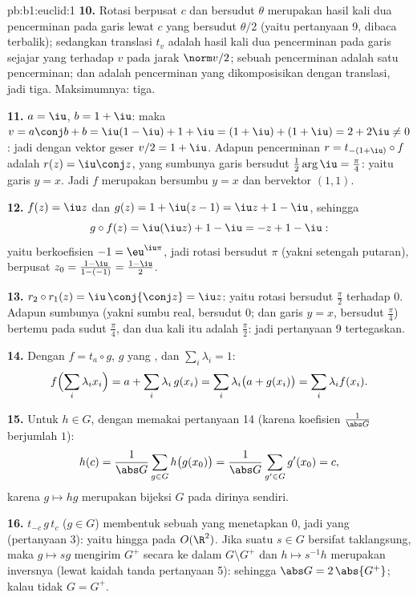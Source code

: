\begin{solution}{pb:b1:euclid:1}
\textbf{10.} Rotasi berpusat $c$ dan bersudut $\theta$ merupakan
hasil kali dua pencerminan pada garis lewat $c$ yang bersudut
$\theta/2$ (yaitu pertanyaan 9, dibaca terbalik); sedangkan translasi $t_v$ adalah
hasil kali dua pencerminan pada garis sejajar yang  terhadap
$v$ pada jarak $\norm v/2$; sebuah pencerminan adalah satu pencerminan; dan
 adalah pencerminan yang dikomposisikan dengan translasi,
jadi tiga. Maksimumnya: tiga.

\textbf{11.} $a = \iu$, $b = 1 + \iu$: maka $v = a\conj b + b =
\iu(1 - \iu) + 1 + \iu = (1 + \iu) + (1 + \iu) = 2 + 2\iu \neq
0$: jadi  dengan vektor geser $v/2 = 1 + \iu$. Adapun
pencerminan $r = t_{-(1+\iu)}\circ f$ adalah $r(z) = \iu\conj z$,
yang sumbunya garis bersudut $\frac12\arg\iu = \frac\pi4$: yaitu
garis $y = x$. Jadi $f$ merupakan  bersumbu $y =
x$ dan bervektor $(1, 1)$.

\textbf{12.} $f(z) = \iu z$ dan $g(z) = 1 + \iu(z - 1) = \iu z
+ 1 - \iu$, sehingga
\[
g\circ f(z) = \iu(\iu z) + 1 - \iu = -z + 1 - \iu :
\]
yaitu berkoefisien  $-1 = \eu^{\iu\pi}$, jadi rotasi bersudut
$\pi$ (yakni setengah putaran), berpusat $z_0 = \frac{1 - \iu}{1 - (-1)}
= \frac{1 - \iu}{2}$.

\textbf{13.} $r_2\circ r_1(z) = \iu\,\conj{\conj z} = \iu z$:
yaitu rotasi bersudut $\frac\pi2$ terhadap $0$. Adapun sumbunya (yakni sumbu
real, bersudut $0$; dan garis $y = x$, bersudut $\frac\pi4$) bertemu pada
sudut $\frac\pi4$, dan dua kali itu adalah $\frac\pi2$: jadi pertanyaan 9
tertegaskan.

\textbf{14.} Dengan $f = t_a\circ g$, $g$ yang , dan $\sum_i
\lambda_i = 1$:
\[
f\Bigl(\sum_i \lambda_i x_i\Bigr)
= a + \sum_i \lambda_i\,g(x_i)
= \sum_i \lambda_i\bigl(a + g(x_i)\bigr)
= \sum_i \lambda_i f(x_i) .
\]

\textbf{15.} Untuk $h \in G$, dengan memakai pertanyaan 14 (karena koefisien
$\frac1{\abs G}$ berjumlah $1$):
\[
h(c) = \frac{1}{\abs G}\sum_{g \in G} h\bigl(g(x_0)\bigr)
= \frac{1}{\abs G}\sum_{g' \in G} g'(x_0) = c ,
\]
karena $g \mapsto hg$ merupakan bijeksi $G$ pada dirinya sendiri.

\textbf{16.}  $t_{-c}\,g\,t_{c}$ ($g \in G$) membentuk
sebuah   yang menetapkan $0$, jadi  yang \emph{}
(pertanyaan 3): yaitu  hingga pada $O(\R^2)$. Jika
suatu $s \in G$ bersifat taklangsung, maka  $g \mapsto sg$ mengirim $G^+$
secara  ke dalam $G\setminus G^+$ dan $h \mapsto s^{-1}h$ merupakan
inversnya (lewat kaidah tanda pertanyaan 5): sehingga $\abs G = 2\,\abs{G^+}$;
kalau tidak $G = G^+$.


\end{solution}
